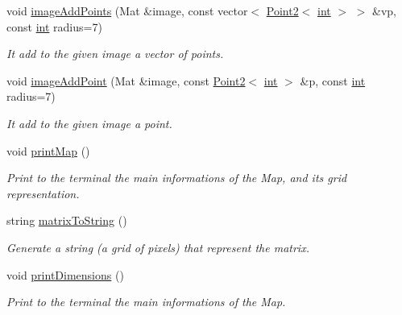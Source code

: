 \begin{DoxyCompactItemize}
void \mbox{\hyperlink{class_mapp_a1029eed72b4607bb9be933c124a82ab6}{image\+Add\+Points}} (Mat \&image, const vector$<$ \mbox{\hyperlink{class_point2}{Point2}}$<$ \mbox{\hyperlink{draw_8hh_aa620a13339ac3a1177c86edc549fda9b}{int}} $>$ $>$ \&vp, const \mbox{\hyperlink{draw_8hh_aa620a13339ac3a1177c86edc549fda9b}{int}} radius=7)
\begin{DoxyCompactList}\small\item\em It add to the given image a vector of points. \end{DoxyCompactList}\item 
void \mbox{\hyperlink{class_mapp_a198e313f3473420c99e6206645f94693}{image\+Add\+Point}} (Mat \&image, const \mbox{\hyperlink{class_point2}{Point2}}$<$ \mbox{\hyperlink{draw_8hh_aa620a13339ac3a1177c86edc549fda9b}{int}} $>$ \&p, const \mbox{\hyperlink{draw_8hh_aa620a13339ac3a1177c86edc549fda9b}{int}} radius=7)
\begin{DoxyCompactList}\small\item\em It add to the given image a point. \end{DoxyCompactList}\item 
void \mbox{\hyperlink{class_mapp_ab795b79c5d655f6a62303c4a415ee73c}{print\+Map}} ()
\begin{DoxyCompactList}\small\item\em Print to the terminal the main informations of the Map, and its grid representation. \end{DoxyCompactList}\item 
string \mbox{\hyperlink{class_mapp_ad38f31eac2ad66836325c152db1f88c3}{matrix\+To\+String}} ()
\begin{DoxyCompactList}\small\item\em Generate a string (a grid of pixels) that represent the matrix. \end{DoxyCompactList}\item 
void \mbox{\hyperlink{class_mapp_a0405773fd644d183c603b569e9957248}{print\+Dimensions}} ()
\begin{DoxyCompactList}\small\item\em Print to the terminal the main informations of the Map. \end{DoxyCompactList}\end{DoxyCompactItemize}
